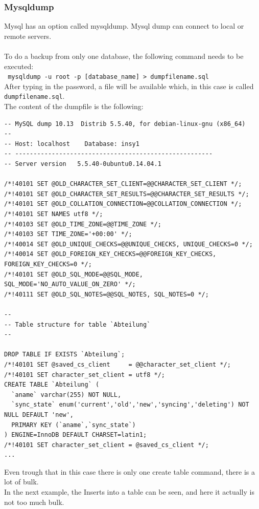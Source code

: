 \documentclass[10pt]{article}
\begin{document}
\subsubsection{Mysqldump}
Mysql has an option called mysqldump. Mysql dump can connect to local or remote servers.\cite{mysqlbackupandrectypesman}
\\ \\
To do a backup from only one database, the following command needs to be executed: \\
\texttt{ mysqldump -u root -p [database\_name] \textgreater ~dumpfilename.sql } \\
After typing in the password, a file will be available which, in this case is called \texttt{dumpfilename.sql}.\\ The content of the dumpfile is the following:
\begin{lstlisting}    
-- MySQL dump 10.13  Distrib 5.5.40, for debian-linux-gnu (x86_64)
--
-- Host: localhost    Database: insy1
-- ------------------------------------------------------
-- Server version	5.5.40-0ubuntu0.14.04.1

/*!40101 SET @OLD_CHARACTER_SET_CLIENT=@@CHARACTER_SET_CLIENT */;
/*!40101 SET @OLD_CHARACTER_SET_RESULTS=@@CHARACTER_SET_RESULTS */;
/*!40101 SET @OLD_COLLATION_CONNECTION=@@COLLATION_CONNECTION */;
/*!40101 SET NAMES utf8 */;
/*!40103 SET @OLD_TIME_ZONE=@@TIME_ZONE */;
/*!40103 SET TIME_ZONE='+00:00' */;
/*!40014 SET @OLD_UNIQUE_CHECKS=@@UNIQUE_CHECKS, UNIQUE_CHECKS=0 */;
/*!40014 SET @OLD_FOREIGN_KEY_CHECKS=@@FOREIGN_KEY_CHECKS, FOREIGN_KEY_CHECKS=0 */;
/*!40101 SET @OLD_SQL_MODE=@@SQL_MODE, SQL_MODE='NO_AUTO_VALUE_ON_ZERO' */;
/*!40111 SET @OLD_SQL_NOTES=@@SQL_NOTES, SQL_NOTES=0 */;

--
-- Table structure for table `Abteilung`
--

DROP TABLE IF EXISTS `Abteilung`;
/*!40101 SET @saved_cs_client     = @@character_set_client */;
/*!40101 SET character_set_client = utf8 */;
CREATE TABLE `Abteilung` (
  `aname` varchar(255) NOT NULL,
  `sync_state` enum('current','old','new','syncing','deleting') NOT NULL DEFAULT 'new',
  PRIMARY KEY (`aname`,`sync_state`)
) ENGINE=InnoDB DEFAULT CHARSET=latin1;
/*!40101 SET character_set_client = @saved_cs_client */;
...
\end{lstlisting}    
Even trough that in this case there is only one create table command, there is a lot of bulk. \\
In the next example, the Inserts into a table can be seen, and here it actually is not too much bulk.
\end{document}
